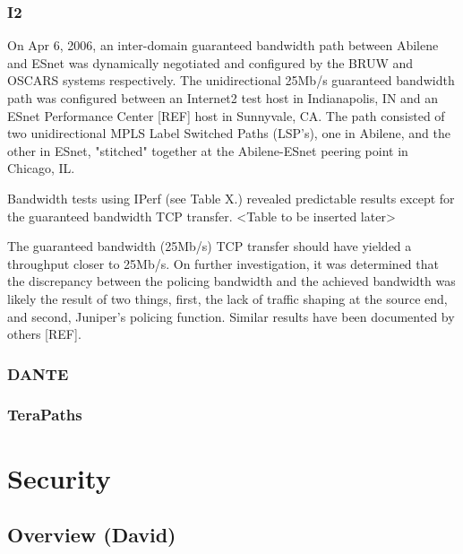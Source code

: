 \documentclass[conference]{IEEEtran}
\begin{document}
\subsubsection{I2}
On Apr 6, 2006, an inter-domain guaranteed bandwidth path between Abilene and 
ESnet was dynamically negotiated and configured by the BRUW and OSCARS systems 
respectively. The unidirectional 25Mb/s guaranteed bandwidth path was 
configured between an Internet2 test host in Indianapolis, IN and an ESnet 
Performance Center [REF] host in Sunnyvale, CA.  The path consisted of two 
unidirectional MPLS Label Switched Paths (LSP's), one in Abilene, and the 
other in ESnet, "stitched" together at the Abilene-ESnet peering point in 
Chicago, IL.

Bandwidth tests using IPerf (see Table X.) revealed predictable results except 
for the guaranteed bandwidth TCP transfer.
<Table to be inserted later>

The guaranteed bandwidth (25Mb/s) TCP transfer should have yielded a throughput 
closer to 25Mb/s.  On further investigation, it was determined that the 
discrepancy between the policing bandwidth and the achieved bandwidth was 
likely the result of two things, first, the lack of traffic shaping at the 
source end, and second, Juniper's policing function.  Similar results have been 
documented by others [REF].

\subsubsection{DANTE}
\subsubsection{TeraPaths}

\section{Security}
\subsection{Overview (David)}
\end{document}
